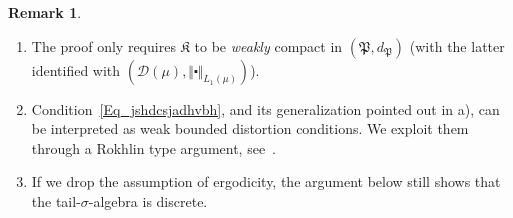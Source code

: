 \documentclass[10pt]{amsart}
\theoremstyle{definition}\newtheorem{defi}[theo]{Definition}\newtheorem{rema}[theo]{Remark}\newtheorem{exam}[theo]{Example}\newtheorem{exem}[theo]{Example}\newtheorem{nota}[theo]{Notation}
\newcommand{\clD}{\mathcal{D}}
\newcommand{\frkK}{\mathfrak{K}}
\newcommand{\frkP}{\mathfrak{P}}
\newcommand*{\alphenumi}{\renewcommand*{\theenumi}{\alph{enumi}}}
\begin{document}
\begin{rema}\leavevmode
\begin{enumerate}\alphenumi
\item The proof only requires $\frkK$ to be \emph{weakly} compact in $(\frkP,d_{\frkP})$ (with the latter identified with $(\clD(\mu),\Vert \centerdot\Vert _{L_{1}(\mu)})$).
\item Condition~\eqref{Eq_jshdcsjadhvbh}, and its generalization pointed out in a), can be interpreted as weak bounded distortion conditions. We exploit them through a Rokhlin type argument, see~\cite{Ro}.

\item If we drop the assumption of ergodicity, the argument below still shows that the tail-$\sigma$-algebra is discrete.
\end{enumerate}
\end{rema}
\end{document}
